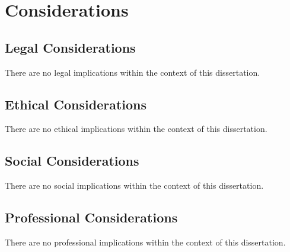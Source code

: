 
\chapter{Considerations}
\label{app:considerations}

\section{Legal Considerations}
\label{app:considerations:legal}

There are no legal implications within the context of this dissertation.
\par

\section{Ethical Considerations}
\label{app:considerations:ethical}

There are no ethical implications within the context of this dissertation.
\par

\section{Social Considerations}
\label{app:considerations:social}

There are no social implications within the context of this dissertation.
\par

\section{Professional Considerations}
\label{app:considerations:professional}

There are no professional implications within the context of this dissertation.
\par
